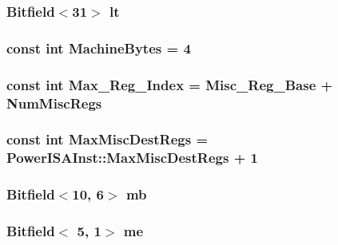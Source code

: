 \label{namespacePowerISA_a554fef169d109a5ccb7ce0dd6a43e521}
\hypertarget{namespacePowerISA_afaddb364ab967e030e35c845e8f9cc5e}{
\subsubsection[{lt}]{\setlength{\rightskip}{0pt plus 5cm}Bitfield$<$31$>$ {\bf lt}}}
\label{namespacePowerISA_afaddb364ab967e030e35c845e8f9cc5e}
\hypertarget{namespacePowerISA_a8f4ba87c53caab23396d3b86b672b0fb}{
\subsubsection[{MachineBytes}]{\setlength{\rightskip}{0pt plus 5cm}const int {\bf MachineBytes} = 4}}
\label{namespacePowerISA_a8f4ba87c53caab23396d3b86b672b0fb}
\hypertarget{namespacePowerISA_a436c085ed5c04b95a1c0cbcc728c39d4}{
\subsubsection[{Max\_\-Reg\_\-Index}]{\setlength{\rightskip}{0pt plus 5cm}const int {\bf Max\_\-Reg\_\-Index} = {\bf Misc\_\-Reg\_\-Base} + {\bf NumMiscRegs}}}
\label{namespacePowerISA_a436c085ed5c04b95a1c0cbcc728c39d4}
\hypertarget{namespacePowerISA_a47db6c8581feb5d9094784b480156f0b}{
\subsubsection[{MaxMiscDestRegs}]{\setlength{\rightskip}{0pt plus 5cm}const int {\bf MaxMiscDestRegs} = PowerISAInst::MaxMiscDestRegs + 1}}
\label{namespacePowerISA_a47db6c8581feb5d9094784b480156f0b}
\hypertarget{namespacePowerISA_af1cfa6deda12f905cf835ed3c3f1adae}{
\subsubsection[{mb}]{\setlength{\rightskip}{0pt plus 5cm}Bitfield$<$10, 6$>$ {\bf mb}}}
\label{namespacePowerISA_af1cfa6deda12f905cf835ed3c3f1adae}
\hypertarget{namespacePowerISA_a1e61430dd10c247a98518b5cc3cf70e8}{
\subsubsection[{me}]{\setlength{\rightskip}{0pt plus 5cm}Bitfield$<$ 5, 1$>$ {\bf me}}}
